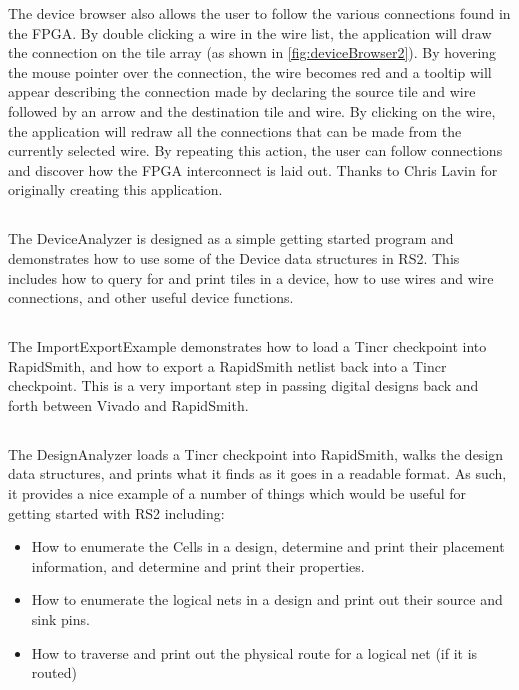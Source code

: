 The device browser also allows the user to follow the various connections found
in the FPGA.  By double clicking a wire in the wire list, the application will
draw the connection on the tile array (as shown in
\autoref{fig:deviceBrowser2}). By hovering the mouse pointer over the
connection, the wire becomes red and a tooltip will appear describing the
connection made by declaring the source tile and wire followed by an arrow and
the destination tile and wire.  By clicking on the wire, the application will
redraw all the connections that can be made from the currently selected wire. 
By repeating this action, the user can follow connections and discover how the
FPGA interconnect is laid out. Thanks to Chris Lavin for originally creating
this application.

\subsection{}
The DeviceAnalyzer is designed as a simple getting started program and
demonstrates how to use some of the Device data structures in RS2. This
includes how to query for and print tiles in a device, how to use wires and
wire connections, and other useful device functions.

\subsection{} \label{sec:importExportExample}
The ImportExportExample demonstrates how to load a Tincr checkpoint into
RapidSmith, and how to export a RapidSmith netlist back into a Tincr
checkpoint. This is a very important step in passing digital designs back
and forth between Vivado and RapidSmith.

\subsection{}
The DesignAnalyzer loads a Tincr checkpoint into RapidSmith, walks
the design data structures, and prints what it finds as it goes in a
readable format. As such, it provides a nice example of a number of things which would
be useful for getting started with RS2 including:
\begin{itemize}
  \item How to enumerate the Cells in a design, determine and print their 
  placement information, and determine and print their properties.
  \item How to enumerate the logical nets in a design and print out their source
  and sink pins. 
  \item How to traverse and print out the physical route for a logical net (if
  it is routed)  
\end{itemize}

